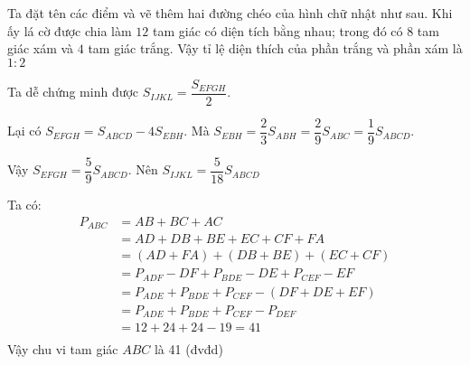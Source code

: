 \begin{Answer}{13}
		Ta đặt tên các điểm và vẽ thêm hai đường chéo của hình chữ nhật như sau.
		Khi ấy lá cờ được chia làm $12$ tam giác có diện tích bằng nhau; trong đó có $8$ tam giác xám và $4$ tam giác trắng. Vậy tỉ lệ diện thích của phần trắng và phần xám là $1:2$
	
\end{Answer}
\begin{Answer}{14}
		Ta dễ chứng minh được ${{S}_{IJKL}}=\dfrac{{{S}_{EFGH}}}{2}.$
		
		Lại có ${{S}_{EFGH}}={{S}_{ABCD}}-4{{S}_{EBH}}$. Mà ${{S}_{EBH}}=\dfrac{2}{3}{{S}_{ABH}}=\dfrac{2}{9}{{S}_{ABC}}=\dfrac{1}{9}{{S}_{ABCD}}.$
		
		Vậy ${{S}_{EFGH}}=\dfrac{5}{9}{{S}_{ABCD}}.$ Nên ${{S}_{IJKL}}=\dfrac{5}{18}{{S}_{ABCD}}$
	
\end{Answer}
\begin{Answer}{15}
		Ta có:
		\begin{align*}
			{{P}_{ABC}}&=AB+BC+AC \\
			& =AD+DB+BE+EC+CF+FA \\
			& =(AD+FA)+(DB+BE)+(EC+CF) \\
			& ={{P}_{ADF}}-DF+{{P}_{BDE}}-DE+{{P}_{CEF}}-EF \\
			& ={{P}_{ADE}}+{{P}_{BDE}}+{{P}_{CEF}}-(DF+DE+EF) \\
			& ={{P}_{ADE}}+{{P}_{BDE}}+{{P}_{CEF}}-{{P}_{DEF}} \\
			& =12+24+24-19=41 \\
		\end{align*}
		Vậy chu vi tam giác $ABC$ là 41 (đvđd)
	
\end{Answer}
